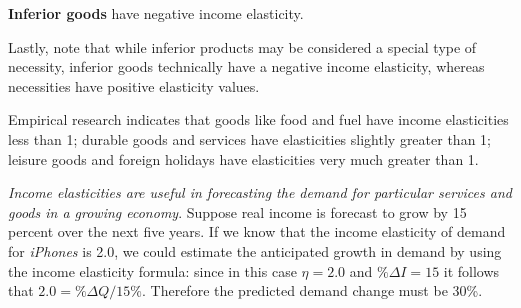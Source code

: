\begin{DefBox}
\textbf{Inferior goods} have negative income elasticity.
\end{DefBox}

Lastly, note that while inferior products may be considered a special type of necessity, inferior goods technically have a negative income elasticity, whereas necessities have positive elasticity values. 

Empirical research indicates that goods like food and fuel have income elasticities less than 1; durable goods and services have elasticities slightly greater than 1; leisure goods and foreign holidays have elasticities very much greater than 1.

\textit{Income elasticities are useful in forecasting the demand for particular services and goods in a growing economy}. Suppose real income is forecast to grow by 15 percent over the next five years. If we know that the income elasticity of demand for \textit{iPhones} is 2.0, we could estimate the anticipated growth in demand by using the income elasticity formula: since in this case $\eta=2.0$ and $\%\Delta I=15$ it follows that $2.0=\%\Delta Q/15\%$. Therefore the predicted demand change must be 30\%.